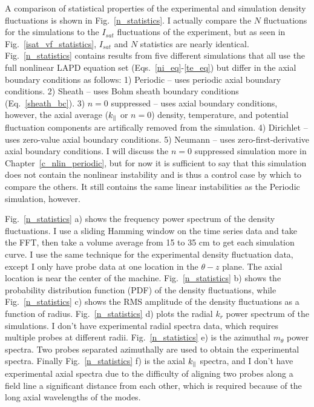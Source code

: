 A comparison of statistical properties of the experimental and simulation density fluctuations is shown in Fig.~\ref{n_statistics}. I actually compare the $N$ fluctuations for the simulations
to the $I_{sat}$ fluctuations of the experiment, but as seen in Fig.~\ref{isat_vf_statistics}, $I_{sat}$ and $N$ statistics are nearly identical.
Fig.~\ref{n_statistics} contains results from five different simulations
that all use the full nonlinear LAPD equation set (Eqs.~\ref{ni_eq}-\ref{te_eq}) but differ in the axial boundary conditions as follows:
1) Periodic -- uses periodic axial boundary conditions. 2) Sheath -- uses Bohm sheath boundary conditions (Eq.~\ref{sheath_bc}). 3) $n=0$ suppressed -- uses axial boundary conditions,
however, the axial average ($k_\parallel$ or $n = 0$) density, temperature, and potential fluctuation components are artifically removed from the simulation. 4) Dirichlet -- uses zero-value axial
boundary conditions. 5) Neumann -- uses zero-first-derivative axial boundary conditions. I will discuss the $n=0$ suppressed simulation more in Chapter~\ref{c_nlin_periodic}, but for
now it is sufficient to say that this simulation does not contain the nonlinear instability and is thus a control case by which to compare the others. It still contains the same
linear instabilities as the Periodic simulation, however.

Fig.~\ref{n_statistics} a) shows the frequency power spectrum of the density fluctuations. I use a sliding Hamming window on the time series data and take the FFT, then take a volume
average from 15 to 35 cm to get each simulation curve. I use the same technique for the experimental density fluctuation data, except I only have probe data at one location in the
$\theta-z$ plane. The axial location is near the center of the machine. Fig.~\ref{n_statistics} b) shows the probability distribution function (PDF) of the density fluctuations,
while Fig.~\ref{n_statistics} c) shows the RMS amplitude of the density fluctuations as a function of radius. Fig.~\ref{n_statistics} d) plots the radial $k_r$ power spectrum of the simulations.
I don't have experimental radial spectra data, which requires multiple probes at different radii. Fig.~\ref{n_statistics} e) is the azimuthal $m_\theta$ power spectra. 
Two probes separated azimuthally are used to obtain the experimental spectra. Finally Fig.~\ref{n_statistics} f) is the axial $k_\parallel$ spectra, and I don't have experimental axial spectra due
to the difficulty of aligning two probes along a field line a significant distance from each other, which is required because of the long axial wavelengths of the modes.

